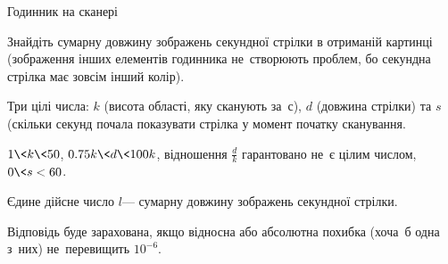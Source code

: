 \begin{problemAllDefault}{Годинник на сканері}
\begin{enumerate}
\end{enumerate}

Знайдіть сумарну довжину зображень секундної стрілки в отриманій картинці (зображення інших елементів годинника 
не~створюють проблем, бо секундна стрілка має зовсім інший колір).


\InputFile
Три цілі числа: $k$ (висота області, яку сканують за~с), 
$d$ (довжина стрілки) та 
$s$ (скільки секунд почала показувати стрілка у момент початку сканування.

${1\<k\<50}$,
${0.75k\<d\<100k}$,
відношення ${\frac{d}{k}}$ гарантовано не~є цілим числом,
${0\<s<60}$.


\OutputFile
Єдине дійсне число $l$\nolinebreak[3] --- сумарну довжину зображень секундної стрілки.

Відповідь буде зарахована, якщо відносна або абсолютна похибка (хоча~б одна з~них) не~перевищить $10^{-6}$.


\Example

\begin{example}
%
\end{example}


\end{problemAllDefault}